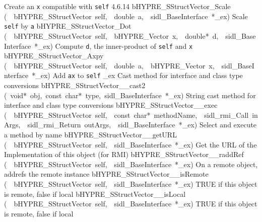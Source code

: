 \documentclass{article}
\begin{document}
\begin{cxxentry}
\begin{cxxentry}
\begin{cxxnames}
        {
Create an {\tt x} compatible with {\tt self}}
        {4.6.14}
        {bHYPRE\_SStructVector\_Scale}
        {(\ \ bHYPRE\_SStructVector\ self,\ \ double\ a,\ \ sidl\_BaseInterface\ *\_ex)}
        {
Scale {\tt self} by {\tt a}}
        {}
\label{cxx.4.6.27}
        {bHYPRE\_SStructVector\_Dot}
        {(\ \ bHYPRE\_SStructVector\ self,\ \ bHYPRE\_Vector\ x,\ \ double*\ d,\ \ sidl\_BaseInterface\ *\_ex)}
        {
Compute {\tt d}, the inner-product of {\tt self} and {\tt x}}
        {}
\label{cxx.4.6.28}
        {bHYPRE\_SStructVector\_Axpy}
        {(\ \ bHYPRE\_SStructVector\ self,\ \ double\ a,\ \ bHYPRE\_Vector\ x,\ \ sidl\_BaseInterface\ *\_ex)}
        {
Add {\tt a}{\tt x} to {\tt self}}
        {}
\label{cxx.4.6.29}
        {\_ex}
        {}
        {
Cast method for interface and class type conversions}
        {}
\label{cxx.4.6.30}
        {bHYPRE\_SStructVector\_\_cast2}
        {(\ void*\ obj,\ const\ char*\ type,\ sidl\_BaseInterface\ *\_ex)}
        {
String cast method for interface and class type conversions}
        {}
\label{cxx.4.6.31}
        {bHYPRE\_SStructVector\_\_exec}
        {(\ \ bHYPRE\_SStructVector\ self,\ \ const\ char*\ methodName,\ \ sidl\_rmi\_Call\ inArgs,\ \ sidl\_rmi\_Return\ outArgs,\ \ sidl\_BaseInterface\ *\_ex)}
        {
Select and execute a method by name}
        {}
\label{cxx.4.6.32}
        {bHYPRE\_SStructVector\_\_getURL}
        {(\ \ bHYPRE\_SStructVector\ self,\ \ sidl\_BaseInterface\ *\_ex)}
        {
Get the URL of the Implementation of this object (for RMI)}
        {}
\label{cxx.4.6.33}
        {bHYPRE\_SStructVector\_\_raddRef}
        {(\ \ bHYPRE\_SStructVector\ self,\ \ sidl\_BaseInterface\ *\_ex)}
        {
On a remote object, addrefs the remote instance}
        {}
\label{cxx.4.6.34}
        {bHYPRE\_SStructVector\_\_isRemote}
        {(\ \ bHYPRE\_SStructVector\ self,\ \ sidl\_BaseInterface\ *\_ex)}
        {
TRUE if this object is remote, false if local}
        {}
\label{cxx.4.6.35}
        {bHYPRE\_SStructVector\_\_isLocal}
        {(\ \ bHYPRE\_SStructVector\ self,\ \ sidl\_BaseInterface\ *\_ex)}
        {
TRUE if this object is remote, false if local}

\end{cxxnames}
\end{cxxentry}
\end{cxxentry}
\end{document}
